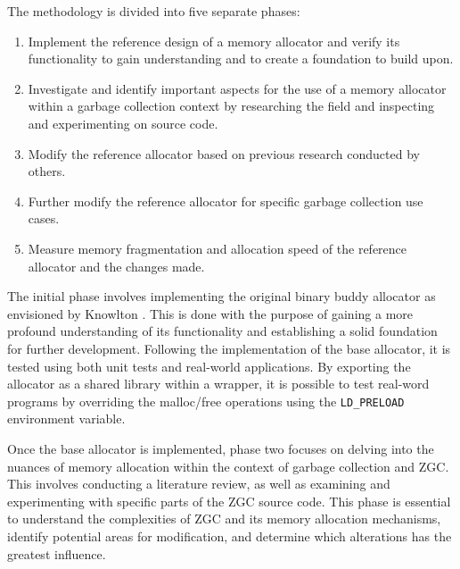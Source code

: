 The methodology is divided into five separate phases:

\begin{enumerate}
    \item Implement the reference design of a memory allocator and verify its functionality to gain understanding and to create a foundation to build upon.
    \item Investigate and identify important aspects for the use of a memory allocator within a garbage collection context by researching the field and inspecting and experimenting on source code.
    \item Modify the reference allocator based on previous research conducted by others.
    \item Further modify the reference allocator for specific garbage collection use cases.
    \item Measure memory fragmentation and allocation speed of the reference allocator and the changes made.
\end{enumerate}

The initial phase involves implementing the original binary buddy allocator as envisioned by Knowlton \cite{buddy}. This is done with the purpose of gaining a more profound understanding of its functionality and establishing a solid foundation for further development. Following the implementation of the base allocator, it is tested using both unit tests and real-world applications. By exporting the allocator as a shared library within a wrapper, it is possible to test real-word programs by overriding the malloc/free operations using the \texttt{LD\_PRELOAD} environment variable.


Once the base allocator is implemented, phase two focuses on delving into the nuances of memory allocation within the context of garbage collection and ZGC. This involves conducting a literature review, as well as examining and experimenting with specific parts of the ZGC source code. This phase is essential to understand the complexities of ZGC and its memory allocation mechanisms, identify potential areas for modification, and determine which alterations has the greatest influence.

